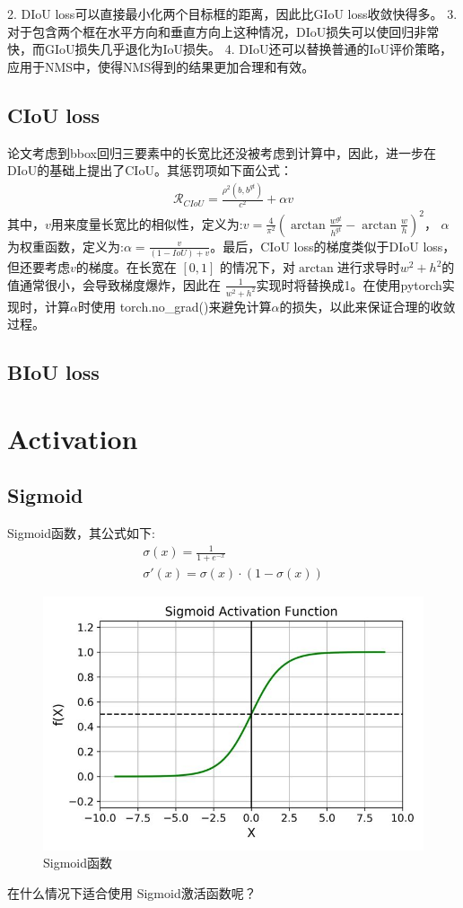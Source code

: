 \documentclass{article}
\begin{document}
2. DIoU loss可以直接最小化两个目标框的距离，因此比GIoU loss收敛快得多。
3. 对于包含两个框在水平方向和垂直方向上这种情况，DIoU损失可以使回归非常快，而GIoU损失几乎退化为IoU损失。
4. DIoU还可以替换普通的IoU评价策略，应用于NMS中，使得NMS得到的结果更加合理和有效。

\subsection{CIoU loss}
论文考虑到bbox回归三要素中的长宽比还没被考虑到计算中，因此，进一步在DIoU的基础上提出了CIoU。其惩罚项如下面公式：
\begin{align}
\mathcal{R}_{CIoU} = \frac{\rho^2(b,b^{gt})}{c^2} + \alpha v
\end{align}
其中，$v$用来度量长宽比的相似性，定义为:$v=\frac{4}{\pi^2}(\arctan{\frac{w^{gt}}{h^{gt}}}- \arctan{\frac{w}{h}})^2 $， $\alpha$为权重函数，定义为:$\alpha = \frac{v}{(1-IoU)+v}$。最后，CIoU loss的梯度类似于DIoU loss，但还要考虑$v$的梯度。在长宽在 $[0,1]$ 的情况下，对$\arctan$进行求导时$w^2+h^2$的值通常很小，会导致梯度爆炸，因此在 $\frac{1}{w^2+h^2}$实现时将替换成1。在使用pytorch实现时，计算$\alpha$时使用 torch.no\_grad()来避免计算$\alpha$的损失，以此来保证合理的收敛过程。

\subsection{BIoU loss}

\section{Activation}
\subsection{Sigmoid}
Sigmoid函数，其公式如下:
\begin{align}
\sigma(x) = \frac{1}{1+e^{-x}} \\
\sigma'(x) = \sigma(x) \cdot (1 - \sigma(x))
\end{align}
\begin{figure}[htp]
\centering
\includegraphics[scale=0.3]{images/activation/sigmoid.jpg}
\caption{Sigmoid函数}
\label{Fig.sigmoid}
\end{figure}
在什么情况下适合使用 Sigmoid激活函数呢？
\end{document}
